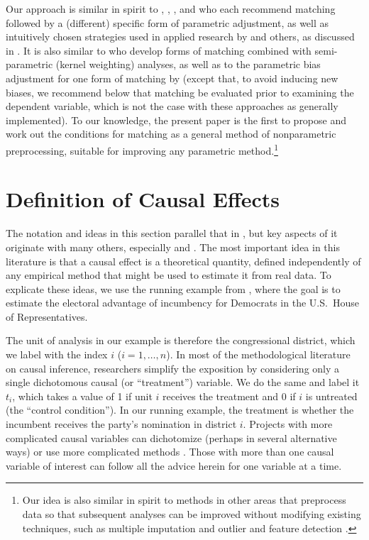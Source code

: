 \documentclass[11pt,titlepage]{article}
\begin{document}
Our approach is similar in spirit to \citet{ImaDyk03},
\citet{RosRub84a}, \citet{Rubin79}, and \citet{RubTho00} who each
recommend matching followed by a (different) specific form of
parametric adjustment, as well as intuitively chosen strategies used
in applied research by \citet{Rosenbaum86} and others, as discussed in
\citet{GlaLevMye03}.  It is also similar to \citet{HecIchTod98} who
develop forms of matching combined with semi-parametric (kernel
weighting) analyses, as well as to the parametric bias adjustment for
one form of matching by \citet{AbaImb04} (except that, to avoid
inducing new biases, we recommend below that matching be evaluated
prior to examining the dependent variable, which is not the case with
these approaches as generally implemented).  To our knowledge, the
present paper is the first to propose and work out the conditions for
matching as a general method of nonparametric preprocessing, suitable
for improving any parametric method.\footnote{Our idea is also similar
  in spirit to methods in other areas that preprocess data so that
  subsequent analyses can be improved without modifying existing
  techniques, such as multiple imputation \citep{Rubin87,KinHonJos01}
  and outlier and feature detection \citep[][Ch.8]{Bishop95}.}

\section{Definition of Causal Effects}

The notation and ideas in this section parallel that in
\citet[][Section 3.1.1]{KinKeoVer94}, but key aspects of it originate
with many others, especially \citet{Rubin74} and \citet{Holland86}.
The most important idea in this literature is that a causal effect is
a theoretical quantity, defined independently of any empirical method
that might be used to estimate it from real data.  To explicate these
ideas, we use the running example from \citet[][Section
3.1.1]{KinKeoVer94}, where the goal is to estimate the electoral
advantage of incumbency for Democrats in the U.S.\ House of
Representatives.

The unit of analysis in our example is therefore the congressional
district, which we label with the index $i$ ($i=1,\dots,n$).  In most
of the methodological literature on causal inference, researchers
simplify the exposition by considering only a single dichotomous
causal (or ``treatment'') variable.  We do the same and label it
$t_i$, which takes a value of 1 if unit $i$ receives the treatment and
0 if $i$ is untreated (the ``control condition'').  In our running
example, the treatment is whether the incumbent receives the party's
nomination in district $i$.  Projects with more complicated causal
variables can dichotomize (perhaps in several alternative ways) or use
more complicated methods \citep{ImaDyk03}.  Those with more than one
causal variable of interest can follow all the advice herein for one
variable at a time.
\end{document}
